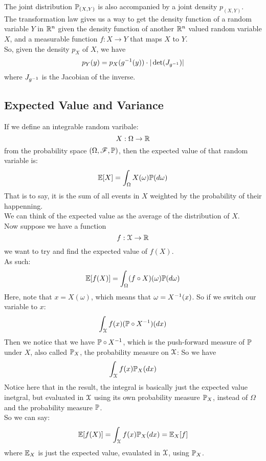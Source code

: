 \documentclass[12pt]{article}
\begin{document}
    The joint distribution $\mathbb{P}_{(X, Y)}$
    is also accompanied by a joint density
    $p_{(X, Y)}$. \\ 

    The transformation law
    gives us a way to get the density function
    of a random variable $Y$ in $\mathbb{R}^n$
    given the density
    function of another $\mathbb{R}^n$ valued
    random variable $X$,
    and a measurable function $f: X \to Y$
    that maps $X$ to $Y$. \\
    So, given the density $p_X$ of $X$,
    we have
    \[ p_Y(y) = p_X(g^{-1}(y))\cdot|\det(J_{g^{-1}})| \]
    where $J_{g^{-1}}$ is the Jacobian
    of the inverse.

    \newpage

    \subsection*{Expected Value and Variance}
    
    If we define an integrable random varibale:
    \[ X: \Omega \to \mathbb{R} \]
    from the probability space
    $(\Omega, \mathscr{F}, \mathbb{P})$,
    then the expected value
    of that random variable is:
    \[ \mathbb{E}[X] = \int_{\Omega}X(\omega)
    \mathbb{P}(d\omega) \]
    That is to say,
    it is the sum of all events
    in $X$ weighted by the probability
    of their happenning. \\
    We can think of the expected value
    as the average of the distribution
    of $X$. \\

    Now suppose we have a function
    \[ f: \mathcal{X} \to \mathbb{R} \]
    we want to try and find
    the expected value of $f(X)$. \\
    As such:
    \[ \mathbb{E}[f(X)]
    = \int_{\Omega}(f \circ X)(\omega)
    \mathbb{P}(d\omega) \]
    Here, note that $x = X(\omega)$,
    which means that $\omega = X^{-1}(x)$.
    So if we switch our variable to $x$:
    \[\int_{\mathcal{X}}f(x)(\mathbb{P} \circ X^{-1})(dx) \]
    Then we notice that we have $\mathbb{P} \circ X^{-1}$,
    which is the push-forward measure of $\mathbb{P}$
    under $X$, also called $\mathbb{P}_X$,
    the probability measure on $\mathcal{X}$:
    So we have
    \[ \int_{\mathcal{X}}f(x)\mathbb{P}_X(dx) \]
    Notice here that in the result,
    the integral is basically just the expected
    value inetgral, but evaluated
    in $\mathcal{X}$ using its own probability
    measure $\mathbb{P}_X$,
    instead of $\Omega$ and the probability
    measure $\mathbb{P}$. \\
    So we can say:
    \[ \mathbb{E}[f(X)] 
    = \int_{\mathcal{X}}f(x)\mathbb{P}_X(dx) 
    = \mathbb{E}_X[f] \]
    where $\mathbb{E}_X$ is just the expected value,
    evaulated in $\mathcal{X}$,
    using $\mathbb{P}_X$. \\
\end{document}

